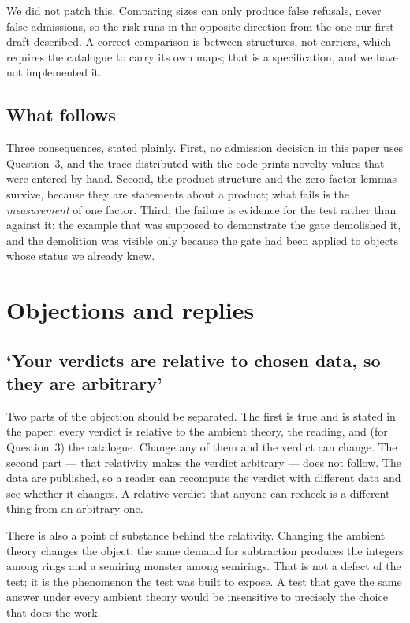 \documentclass[12pt,a4paper]{article}
\begin{document}
We did not patch this.  Comparing sizes can only produce false refusals, never
false admissions, so the risk runs in the opposite direction from the one our
first draft described.  A correct comparison is between structures, not carriers,
which requires the catalogue to carry its own maps; that is a specification, and
we have not implemented it.

\subsection{What follows}

Three consequences, stated plainly.  First, no admission decision in this paper
uses Question~3, and the trace distributed with the code prints novelty values
that were entered by hand.  Second, the product structure and the zero-factor
lemmas survive, because they are statements about a product; what fails is the
\emph{measurement} of one factor.  Third, the failure is evidence for the test
rather than against it: the example that was supposed to demonstrate the gate
demolished it, and the demolition was visible only because the gate had been
applied to objects whose status we already knew.

\section{Objections and replies}
\label{sec:objections}

\subsection{`Your verdicts are relative to chosen data, so they are arbitrary'}

Two parts of the objection should be separated.  The first is true and is stated
in the paper: every verdict is relative to the ambient theory, the reading, and
(for Question~3) the catalogue.  Change any of them and the verdict can change.
The second part --- that relativity makes the verdict arbitrary --- does not
follow.  The data are published, so a reader can recompute the verdict with
different data and see whether it changes.  A relative verdict that anyone can
recheck is a different thing from an arbitrary one.

There is also a point of substance behind the relativity.  Changing the ambient
theory changes the object: the same demand for subtraction produces the integers
among rings and a semiring monster among semirings.  That is not a defect of the
test; it is the phenomenon the test was built to expose.  A test that gave the
same answer under every ambient theory would be insensitive to precisely the
choice that does the work.
\end{document}
